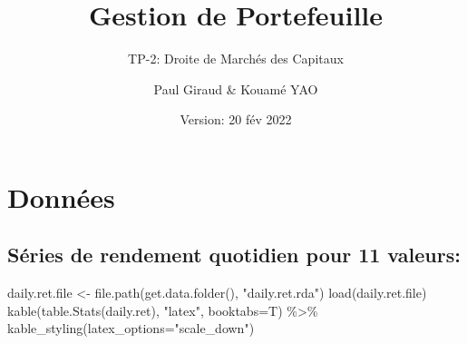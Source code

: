 \documentclass[
]{article}
\title{Gestion de Portefeuille}
\subtitle{TP-2: Droite de Marchés des Capitaux}
\author{Paul Giraud \& Kouamé YAO}
\date{Version: 20 fév 2022}
\newenvironment{Shaded}{\begin{snugshade}}{\end{snugshade}}
\newcommand{\AttributeTok}[1]{\textcolor[rgb]{0.77,0.63,0.00}{#1}}
\newcommand{\FunctionTok}[1]{\textcolor[rgb]{0.00,0.00,0.00}{#1}}
\newcommand{\NormalTok}[1]{#1}
\newcommand{\OtherTok}[1]{\textcolor[rgb]{0.56,0.35,0.01}{#1}}
\newcommand{\SpecialCharTok}[1]{\textcolor[rgb]{0.00,0.00,0.00}{#1}}
\newcommand{\StringTok}[1]{\textcolor[rgb]{0.31,0.60,0.02}{#1}}
\begin{document}
\maketitle

\hypertarget{donnuxe9es}{%
\section{Données}\label{donnuxe9es}}

\hypertarget{suxe9ries-de-rendement-quotidien-pour-11-valeurs}{%
\subsection{Séries de rendement quotidien pour 11
valeurs:}\label{suxe9ries-de-rendement-quotidien-pour-11-valeurs}}

\begin{Shaded}
\begin{Highlighting}[]
\NormalTok{daily.ret.file }\OtherTok{\textless{}{-}} \FunctionTok{file.path}\NormalTok{(}\FunctionTok{get.data.folder}\NormalTok{(), }\StringTok{"daily.ret.rda"}\NormalTok{)}
\FunctionTok{load}\NormalTok{(daily.ret.file)}
\FunctionTok{kable}\NormalTok{(}\FunctionTok{table.Stats}\NormalTok{(daily.ret), }\StringTok{"latex"}\NormalTok{, }\AttributeTok{booktabs=}\NormalTok{T) }\SpecialCharTok{\%\textgreater{}\%} \FunctionTok{kable\_styling}\NormalTok{(}\AttributeTok{latex\_options=}\StringTok{"scale\_down"}\NormalTok{)}
\end{Highlighting}
\end{Shaded}
\end{document}
